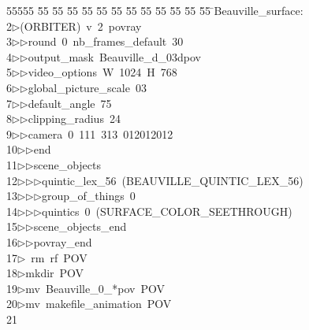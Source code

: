%
%
\begin{tabbing}
55555 \= 55 \= 55 \= 55 \= 55 \= 55 \= 55 \= 55 \= 55 \= 55 \= 55 \= 55 \= 55 \= \>Beauville\_surface:\\[0pt]
2\>$\triangleright$\>(ORBITER)\ v\ 2\ povray\ \\[0pt]
3\>$\triangleright$\>$\triangleright$\>round\ 0\ nb\_frames\_default\ 30\ \\[0pt]
4\>$\triangleright$\>$\triangleright$\>output\_mask\ Beauville\_d\_03dpov\ \\[0pt]
5\>$\triangleright$\>$\triangleright$\>video\_options\ W\ 1024\ H\ 768\ \\[0pt]
6\>$\triangleright$\>$\triangleright$\>global\_picture\_scale\ 03\ \\[0pt]
7\>$\triangleright$\>$\triangleright$\>default\_angle\ 75\ \\[0pt]
8\>$\triangleright$\>$\triangleright$\>clipping\_radius\ 24\ \\[0pt]
9\>$\triangleright$\>$\triangleright$\>camera\ 0\ 111\ 313\ 012012012\ \\[0pt]
10\>$\triangleright$\>$\triangleright$\>end\ \\[0pt]
11\>$\triangleright$\>$\triangleright$\>scene\_objects\ \\[0pt]
12\>$\triangleright$\>$\triangleright$\>$\triangleright$\>quintic\_lex\_56\ (BEAUVILLE\_QUINTIC\_LEX\_56)\ \\[0pt]
13\>$\triangleright$\>$\triangleright$\>$\triangleright$\>group\_of\_things\ 0\ \\[0pt]
14\>$\triangleright$\>$\triangleright$\>$\triangleright$\>quintics\ 0\ (SURFACE\_COLOR\_SEETHROUGH)\ \\[0pt]
15\>$\triangleright$\>$\triangleright$\>scene\_objects\_end\ \\[0pt]
16\>$\triangleright$\>$\triangleright$\>povray\_end\\[0pt]
17\>$\triangleright$\>\ rm\ rf\ POV\\[0pt]
18\>$\triangleright$\>mkdir\ POV\\[0pt]
19\>$\triangleright$\>mv\ Beauville\_0\_*pov\ POV\\[0pt]
20\>$\triangleright$\>mv\ makefile\_animation\ POV\\[0pt]
21\>\end{tabbing}
